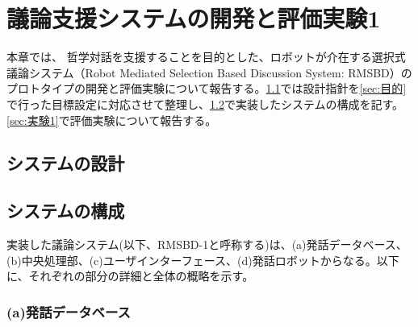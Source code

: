 \documentclass[11pt, a4paper]{jreport} %
\begin{document}
\chapter{議論支援システムの開発と評価実験1}

本章では、%
哲学対話を支援することを目的とした、ロボットが介在する選択式議論システム（Robot Mediated Selection Based Discussion System: RMSBD）のプロトタイプの開発と評価実験について報告する。\ref{sec:要件1}では設計指針を\ref{sec:目的}で行った目標設定に対応させて整理し、\ref{sec:構成1}で実装したシステムの構成を記す。\ref{sec:実験1}で評価実験について報告する。




\section{システムの設計}
\label{sec:要件1}



\section{システムの構成}
\label{sec:構成1}
実装した議論システム(以下、RMSBD-1と呼称する)は、(a)発話データベース、(b)中央処理部、(c)ユーザインターフェース、(d)発話ロボットからなる。以下に、それぞれの部分の詳細と全体の概略を示す。

\subsection*{(a)発話データベース}
\end{document}
